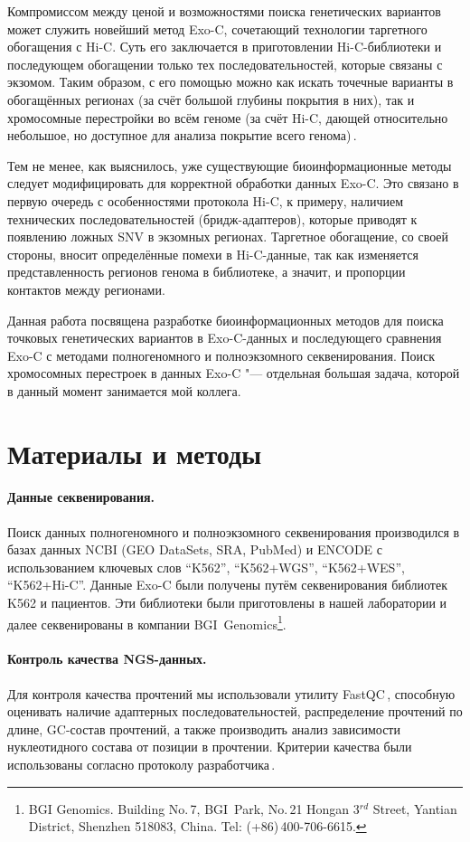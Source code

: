 \documentclass[a4paper,14pt]{extarticle}
\newcommand{\utilname}[1]{\textenglish{#1}}
\newcommand{\ecitep}[1]{\textenglish{\citep{#1}}}
\begin{document}
Компромиссом между ценой и возможностями поиска генетических вариантов может служить новейший метод Exo-C, сочетающий технологии таргетного обогащения с Hi-C.
Суть его заключается в приготовлении Hi-C\hyp{}библиотеки и последующем обогащении только тех последовательностей, которые связаны с экзомом.
Таким образом, с его помощью можно как искать точечные варианты в обогащённых регионах (за счёт большой глубины покрытия в них), так и хромосомные перестройки во всём геноме (за счёт Hi-C, дающей относительно небольшое, но доступное для анализа покрытие всего генома)\,\ecitep{Mozheiko_2019}.

Тем не менее, как выяснилось, уже существующие биоинформационные методы следует модифицировать для корректной обработки данных Exo-C.
Это связано в первую очередь с особенностями протокола Hi-C, к примеру, наличием технических последовательностей (бридж-адаптеров), которые приводят к появлению ложных SNV в экзомных регионах.
Таргетное обогащение, со своей стороны, вносит определённые помехи в Hi-C-данные, так как изменяется представленность регионов генома в библиотеке, а значит, и пропорции контактов между регионами.

Данная работа посвящена разработке биоинформационных методов для поиска точковых генетических вариантов в Exo-C-данных и последующего сравнения Exo-C с методами полногеномного и полноэкзомного секвенирования.
Поиск хромосомных перестроек в данных Exo-C "--- отдельная большая задача, которой в данный момент занимается мой коллега.

\section{Материалы и методы}

\paragraph{Данные секвенирования.}
Поиск данных полногеномного и полноэкзомного секвенирования производился в базах данных NCBI (GEO DataSets, SRA, PubMed) и ENCODE с использованием ключевых слов ``K562'', ``K562+WGS'', ``K562+WES'', ``K562+Hi-C''.
Данные Exo-C были получены путём секвенирования библиотек K562 и пациентов.
Эти библиотеки были приготовлены в нашей лаборатории и далее секвенированы в компании BGI~Genomics\footnote{BGI Genomics. Building No.\,7, BGI~Park, No.\,21 Hongan 3$^{rd}$ Street, Yantian District, Shenzhen 518083, China. Tel: (+86)\,400-706-6615.}.

\paragraph{Контроль качества NGS\hyp{}данных.}
Для контроля качества прочтений мы использовали утилиту \utilname{FastQC}\,\ecitep{FastQC}, способную оценивать наличие адаптерных последовательностей, распределение прочтений по длине, GC-состав прочтений, а также производить анализ зависимости нуклеотидного состава от позиции в прочтении.
Критерии качества были использованы согласно протоколу разработчика\,\ecitep{FastQC}.
\end{document}

